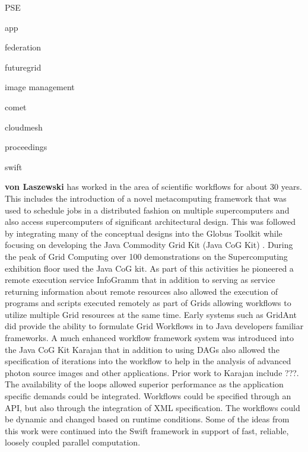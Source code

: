 \documentclass[utf8]{FrontiersinVancouver} %
\begin{document}
PSE
\citep{las-01-pse}

app
\citep{las-00-sbc}


federation \citep{las-08-federated-cloud}

futuregrid \citep{las-20-10gce} \citep{las-14-bigdata} \citep{las-12-fg-bookchapter}
\citep{las-17-futuregrid}

image management
\citep{las-12-imagemanagement}

comet \citep{las-16-virtcluster}
\citep{las-19-harc-comet}

cloudmesh
\citep{las-17-cloudmesh}

proceedings
\citep{las-12-fg-1471}

swift 
\citep{las--7-swift}

{\bf von Laszewski} has worked in the area of scientific workflows for about 30 years. This includes the introduction of a novel metacomputing framework \citep{las-99-loosely,las-94-ecwmf,las-96-ecwmf} that was used to schedule jobs in a distributed fashion on multiple supercomputers and also access supercomputers of significant architectural design. This was followed by integrating many of the conceptual designs into the Globus Toolkit while focusing on developing the Java Commodity Grid Kit (Java CoG Kit) \citep{las-06-workcoordination,
las-06-workflow-book,
las-06-exp-a,
las-05-workflowrepo,
las-05-workflow-jgc,
las-05-exp,
las-04-abstraction-j,
las-03-gridcomputing,
las-02-javacog,
las-00-grande,
las-01-cog-concurency}. 
During the peak of Grid Computing over 100 demonstrations on the Supercomputing exhibition floor used the Java CoG kit. As part of this activities he pioneered a remote execution service InfoGramm 
\citep{las-02-infogram}
that in addition to serving as service returning information about remote resources also allowed the execution of programs and scripts executed remotely as part of Grids allowing workflows to utilize multiple Grid resources at the same time. Early systems such as GridAnt \citep{las-04-gridant} 
did provide the ability to formulate Grid Workflows in to Java developers familiar frameworks. A much enhanced workflow framework  system was introduced into the  Java CoG Kit Karajan \citep{las-06-workflow-book} that in addition to using DAGs also allowed the specification of iterations into the workflow to help in the analysis of advanced photon source images and other applications. Prior work to Karajan include ???. The availability of the loops allowed superior performance as the application specific demands could be integrated. Workflows could be specified through an API, but also through the integration of XML specification. The workflows could be dynamic and changed based on runtime conditions. Some of the ideas from this work were continued into the Swift framework in support of fast, reliable, loosely coupled parallel computation. 
\end{document}
